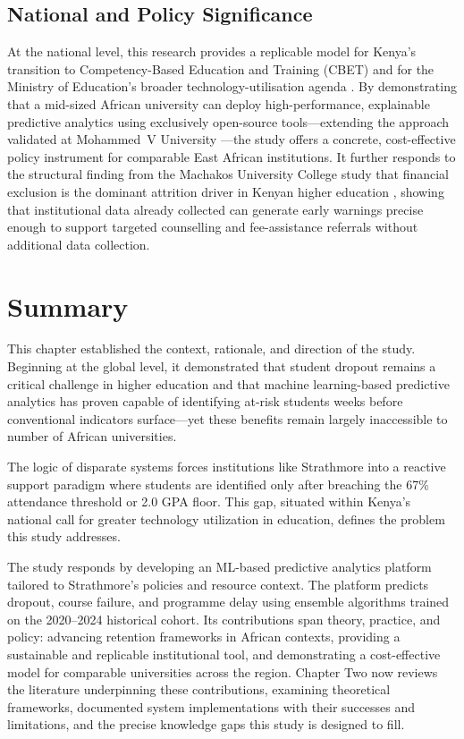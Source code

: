 \documentclass[12pt]{report}
\begin{document}
\subsection{National and Policy Significance}
At the national level, this research provides a replicable model for Kenya's
transition to Competency-Based Education and Training (CBET) and for the Ministry
of Education's broader technology-utilisation agenda \parencite{kippra2024}. By
demonstrating that a mid-sized African university can deploy high-performance,
explainable predictive analytics using exclusively open-source tools---extending
the approach validated at Mohammed~V University \parencite{bettahi2025}---the study
offers a concrete, cost-effective policy instrument for comparable East African
institutions. It further responds to the structural finding from the Machakos
University College study that financial exclusion is the dominant attrition driver
in Kenyan higher education \parencite{ngemu2015}, showing that institutional data
already collected can generate early warnings precise enough to support targeted
counselling and fee-assistance referrals without additional data collection.

\section{Summary}
This chapter established the context, rationale, and direction of the study. Beginning at
the global level, it demonstrated that student dropout remains a critical challenge in
higher education and that machine learning-based predictive analytics has proven capable
of identifying at-risk students weeks before conventional indicators surface---yet these
benefits remain largely inaccessible to number of African universities.

The logic of disparate systems forces institutions like Strathmore into a reactive support
paradigm where students are identified only after breaching the 67\% attendance threshold
or 2.0 GPA floor. This gap, situated within Kenya's national call for greater technology
utilization in education, defines the problem this study addresses.

The study responds by developing an ML-based predictive analytics platform tailored to
Strathmore's policies and resource context. The platform predicts dropout, course failure,
and programme delay using ensemble algorithms trained on the 2020--2024 historical cohort.
Its contributions span theory, practice, and policy: advancing retention frameworks in
African contexts, providing a sustainable and replicable institutional tool, and
demonstrating a cost-effective model for comparable universities across the region.
Chapter Two now reviews the literature underpinning these contributions, examining
theoretical frameworks, documented system implementations with their successes and
limitations, and the precise knowledge gaps this study is designed to fill.
\end{document}
